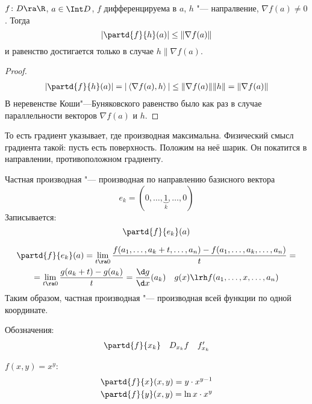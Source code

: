 \begin{theorem}
	$f\colon D \ra \R$, $a \in \Int D$, $f$ дифференцируема в $a$, $h$ "--- напралвение, $\nabla f(a) \ne 0$.
	Тогда
	\[ \left|\partd{f}{h}(a)\right| \le \|\nabla f(a) \| \]
	и равенство достигается только в случае $h \parallel \nabla f(a)$.
\end{theorem}
\begin{proof}
	\begin{gather*}
		\left|\partd{f}{h}(a)\right| = |\left< \nabla f(a), h\right>| \le \|\nabla f(a)\| \|h\| = \|\nabla f(a) \|
	\end{gather*}
	В неревенстве Коши"---Буняковского равенство было как раз в случае параллельности векторов $\nabla f(a)$ и $h$.
\end{proof}

То есть градиент указывает, где производная максимальна.
Физический смысл градиента такой: пусть есть поверхность. Положим на неё шарик. Он покатится в направлении, противоположном градиенту.

\begin{Def}
	Частная производная "--- производная по направлению базисного вектора
	\[ e_k = (0, \dots, \underbrace{1}_{k}, \dots, 0) \]
	Записывается:
	\[ \partd{f}{e_k} (a) \]
\end{Def}
\begin{Rem}
	\begin{gather*}
		\partd{f}{e_k} (a) = \lim_{t \ra 0} \frac{f(a_1, \dots, a_k + t, \dots, a_n) - f(a_1, \dots, a_k, \dots, a_n)}t = \\
		= \lim_{t \ra 0} \frac{g(a_k + t) - g(a_k)}t = \frac{\d g}{\d x} (a_k) \quad g(x) \lrh f(a_1, \dots, x, \dots, a_n)
	\end{gather*}
	Таким образом, частная производная "--- производная всей функции по одной координате.
\end{Rem}
Обозначения:
\[
	\begin{matrix}
		\partd{f}{x_k} & D_{x_k} f & f'_{x_k}
	\end{matrix}
\]

\begin{exmp}
	$f(x, y) = x^y$:
	\begin{gather*}
		\partd{f}{x} (x, y) = y \cdot x^{y - 1} \\
		\partd{f}{y} (x, y) = \ln x \cdot x^y \\
	\end{gather*}
\end{exmp}

